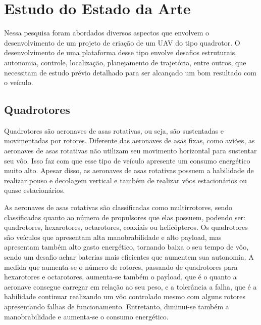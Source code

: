 \chapter{Estudo do Estado da Arte}
\label{chap:metod}
Nessa pesquisa foram abordados diversos aspectos que envolvem o desenvolvimento de um projeto de criação de um UAV do tipo quadrotor. O desenvolvimento de uma plataforma desse tipo envolve desafios estruturais, autonomia, controle, localização, planejamento de trajetória, entre outros, que necessitam de estudo prévio detalhado para ser alcançado um bom resultado com o veículo.

\section{Quadrotores}
Quadrotores são aeronaves de asas rotativas, ou seja, são sustentadas e movimentadas por rotores. Diferente das aeronaves de asas fixas, como aviões, as aeronaves de asas rotativas não utilizam seu movimento horizontal para sustentar seu vôo. Isso faz com que esse tipo de veículo apresente um consumo energético muito alto. Apesar disso, as aeronaves de asas rotativas possuem a habilidade de realizar pouso e decolagem vertical e também de realizar vôos estacionários ou quase estacionários.

As aeronaves de asas rotativas são classificadas como multirrotores, sendo classificadas quanto ao número de propulsores que elas possuem, podendo ser: quadrotores, hexarotores, octarotores, coaxiais ou helicópteros. Os quadrotores são veículos que apresentam alta manobrabilidade e alto payload, mas apresentam também alto gasto energético, tornando baixa o seu tempo de vôo, sendo um desafio achar baterias mais eficientes que aumentem sua autonomia. A medida que aumenta-se o número de rotores, passando de quadrotores para hexarotores e octarotores, aumenta-se também o payload, que é o quanto a aeronave consegue carregar em relação ao seu peso, e a tolerância a falha, que é a habilidade continuar realizando um vôo controlado mesmo com alguns rotores apresentando falhas de funcionamento. Entretanto, diminui-se também a manobrabilidade e aumenta-se o consumo energético.

